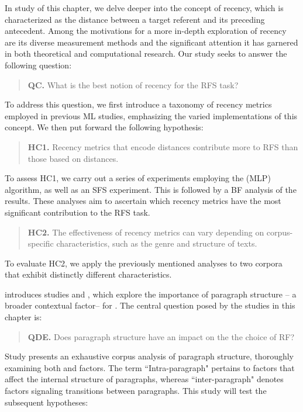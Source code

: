 In study \studC of this chapter, we delve deeper into the concept of recency, which is characterized as the distance between a target referent and its preceding antecedent. Among the motivations for a more in-depth exploration of recency are its diverse measurement methods and the significant attention it has garnered in both theoretical and computational research. Our study seeks to answer the following question:

\begin{quote}
	\textbf{QC.} What is the best notion of recency for the RFS task?
\end{quote}

To address this question, we first introduce a taxonomy of recency metrics employed in previous ML studies, emphasizing the varied implementations of this concept. We then put forward the following hypothesis:

\begin{quote}
	\textbf{HC1.} Recency metrics that encode  distances contribute more to RFS than those based on  distances.
\end{quote}

To assess HC1, we carry out a series of experiments employing the  (MLP) algorithm, as well as an SFS experiment. This is followed by a BF analysis of the results. These analyses aim to ascertain which recency metrics have the most significant contribution to the RFS task.

\begin{quote}
	\textbf{HC2.} The effectiveness of recency metrics can vary depending on corpus-specific characteristics, such as the genre and structure of texts.
\end{quote}

To evaluate HC2, we apply the previously mentioned analyses to two corpora that exhibit distinctly different characteristics.

 introduces studies \studD and \studE, which explore the importance of paragraph structure -- a broader contextual factor-- for \context. The central question posed by the studies in this chapter is:

\begin{quote}
	\textbf{QDE.} Does paragraph structure have an impact on the the choice of RF?
\end{quote}

Study \studD presents an exhaustive corpus analysis of paragraph structure, thoroughly examining both  and  factors. The term ``Intra-paragraph" pertains to factors that affect the internal structure of paragraphs, whereas ``inter-paragraph" denotes factors signaling transitions between paragraphs. This study will test the subsequent hypotheses:

